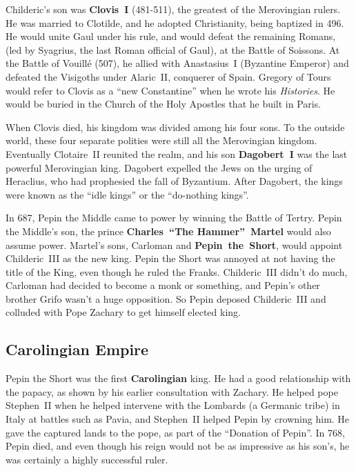 Childeric's son was \textbf{Clovis~I} (481-511), the greatest of the Merovingian rulers.
He was married to Clotilde, and he adopted Christianity, being baptized in 496.
He would unite Gaul under his rule, and would defeat the remaining Romans,
(led by Syagrius, the last Roman official of Gaul), at the Battle of Soissons.
At the Battle of Vouill\'e (507), he allied with Anastasius~I (Byzantine Emperor)
and defeated the Visigoths under Alaric~II, conquerer of Spain.
Gregory of Tours would refer to Clovis as a ``new Constantine'' when he wrote his \textit{Histories}.
He would be buried in the Church of the Holy Apostles that he built in Paris.

When Clovis died, his kingdom was divided among his four sons.
To the outside world, these four separate polities were still all the Merovingian kingdom.
Eventually Clotaire~II reunited the realm, and his son \textbf{Dagobert~I} was the last powerful Merovingian king.
Dagobert expelled the Jews on the urging of Heraclius, who had prophesied the fall of Byzantium.
After Dagobert, the kings were known as the ``idle kings'' or the ``do-nothing kings''.

In 687, Pepin the Middle came to power by winning the Battle of Tertry.
Pepin the Middle's son, the prince \textbf{Charles~``The Hammer''~Martel} would also assume power.
Martel's sons, Carloman and \textbf{Pepin~the~Short}, would appoint Childeric~III as the new king.
Pepin the Short was annoyed at not having the title of the King, even though he ruled the Franks.
Childeric~III didn't do much, Carloman had decided to become a monk or something,
and Pepin's other brother Grifo wasn't a huge opposition.
So Pepin deposed Childeric~III and colluded with Pope Zachary to get himself elected king.

\subsection*{Carolingian Empire}

Pepin the Short was the first \textbf{Carolingian} king.
He had a good relationship with the papacy, as shown by his earlier consultation with Zachary.
He helped pope Stephen~II when he helped intervene with the Lombards (a Germanic tribe)
in Italy at battles such as Pavia,
and Stephen~II helped Pepin by crowning him.
He gave the captured lands to the pope, as part of the ``Donation of Pepin''.
In 768, Pepin died, and even though his reign would not be as impressive as his son's,
he was certainly a highly successful ruler.

